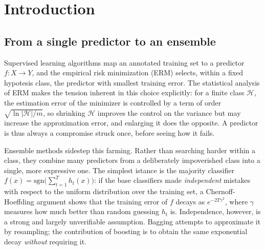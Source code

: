 \documentclass[a4paper, 10pt]{article}
\title{\papertitle}
\author{
    Marco Colangelo$^1$ \\
    \normalsize $^1$Department of Computer Science, University of Milan, Milan, Italy \\
    \normalsize \textit{Corresponding author:} marco.colangelo@studenti.unimi.it
}
\date{\today}
\begin{document}
\maketitle

\begin{abstract}
    !!!!!!
\end{abstract}

\section{Introduction}
\subsection{From a single predictor to an ensemble}
Supervised learning algorithms map an annotated training set to a predictor $ f: X \to Y$, and the empirical risk minimization (ERM) selects, within a fixed hypotesis class, the predictor with smallest training error. The statistical analysis of ERM makes the tension inherent in this choice explicitly: for a finite class $ \mathcal{H} $, the estimation error of the minimizer is controlled by a term of order $\sqrt{\ln|\mathcal{H}| / m}$, so shrinking $ \mathcal{H} $ improves the control on the variance but may increase the approximation error, and enlarging it does the opposite. A predictor is thus always a compromise struck once, before seeing how it fails.

Ensemble methods sidestep this farming. Rather than searching harder within a class, they combine many predictors from a deliberately impoverished class into a single, more expressive one. The simplest istance is the majority classifier $ f(x) = \mathrm{sgn}\big(\sum_{t=1}^T h_t(x)\big)$: if the base classifiers made \emph{independent} mistakes with respect to the uniform distribution over the training set, a Chernoff-Hoeffding argument shows that the training error of $f$ decays as $e^{-2T\gamma^2}$, where $\gamma$ measures how much better than random guessing $h_t$ is. Independence, however, is a strong and largely unverifiable assumption. Bagging attempts to approximate it by resampling; the contribution of boosting is to obtain the same exponential decay \emph{without} requiring it.
\end{document}
